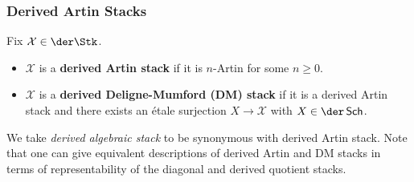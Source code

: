 \documentclass[11pt]{beamer}
\newcommand{\X}{\mathcal{X}}
\begin{document}
\begin{frame}
\frametitle{Derived Artin Stacks}
\pause Fix $\X\in\der\Stk$.
\begin{itemize}
\pause\item $\X$ is a \textbf{derived Artin stack} if it is $n$-Artin for some $n\geq0$.
\pause\item $\X$ is a \textbf{derived Deligne-Mumford (DM) stack} if it is a derived Artin stack and there exists an \'{e}tale surjection $X\to\X$ with $X\in\der\Sch$.
\end{itemize}
\pause We take \emph{derived algebraic stack} to be synonymous with derived Artin stack. \pause Note that one can give equivalent descriptions of derived Artin and DM stacks in terms of representability of the diagonal and derived quotient stacks.
\end{frame}
\end{document}
